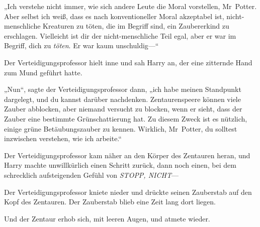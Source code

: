 „Ich verstehe nicht immer, wie sich andere Leute die Moral vorstellen, Mr~Potter. Aber selbst ich weiß, dass es nach konventioneller Moral akzeptabel ist, nicht-menschliche Kreaturen zu töten, die im Begriff sind, ein Zaubererkind zu erschlagen. Vielleicht ist dir der nicht-menschliche Teil egal, aber er war im Begriff, dich zu \emph{töten}. Er war kaum unschuldig—“

Der Verteidigungsprofessor hielt inne und sah Harry an, der eine zitternde Hand zum Mund geführt hatte.

„Nun“, sagte der Verteidigungsprofessor dann, „ich habe meinen Standpunkt dargelegt, und du kannst darüber nachdenken. Zentaurenspeere können viele Zauber abblocken, aber niemand versucht zu blocken, wenn er sieht, dass der Zauber eine bestimmte Grünschattierung hat. Zu diesem Zweck ist es nützlich, einige grüne Betäubungszauber zu kennen. Wirklich, Mr~Potter, du solltest inzwischen verstehen, wie ich arbeite.“

Der Verteidigungsprofessor kam näher an den Körper des Zentauren heran, und Harry machte unwillkürlich einen Schritt zurück, dann noch einen, bei dem schrecklich aufsteigenden Gefühl von \emph{STOPP, NICHT}—

Der Verteidigungsprofessor kniete nieder und drückte seinen Zauberstab auf den Kopf des Zentauren.
%
Der Zauberstab blieb eine Zeit lang dort liegen.

Und der Zentaur erhob sich, mit leeren Augen, und atmete wieder.

